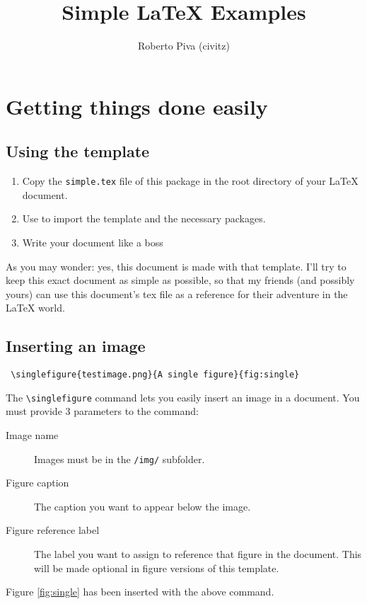 

\title{Simple \LaTeX{} Examples}
\author{Roberto Piva (civitz)}


\maketitle

\tableofcontents
\section{Getting things done easily}
\label{sec:gtde}
\subsection{Using the template}
\begin{enumerate}
 \item Copy the \verb!simple.tex! file of this package in the root directory of your \LaTeX{} document. 
 \item Use \verb!! to import the template and the necessary packages.
 \item Write your document like a boss
\end{enumerate}
As you may wonder: yes, this document is made with that template. 
I'll try to keep this exact document as simple as possible, so that my friends (and possibly yours) 
can use this document's tex file as a reference for their adventure in the \LaTeX{} world.

\subsection{Inserting an image}
\begin{verbatim}
 \singlefigure{testimage.png}{A single figure}{fig:single}
\end{verbatim}
The \verb!\singlefigure! command lets you easily insert an image in a document.
You must provide 3 parameters to the command: 
\begin{description}
 \item[Image name] 
    Images must be in the \verb!/img/! subfolder.
 \item[Figure caption] 
    The caption you want to appear below the image.
 \item[Figure reference label] 
    The label you want to assign to reference that figure in the document. 
    This will be made optional in figure versions of this template.
\end{description}
Figure \ref{fig:single} has been inserted with the above command.

